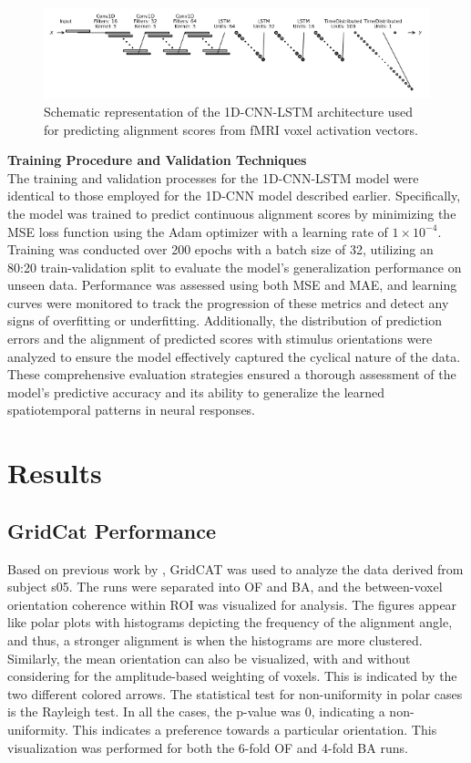 \documentclass[a4paper]{article}
\begin{document}
\begin{figure}
    \centering
    \includegraphics[width=1\linewidth]{hybrid2.png}
    \caption{Schematic representation of the 1D-CNN-LSTM architecture used for predicting alignment scores from
fMRI voxel activation vectors.}
    \label{fig:1D-CNN-LSTM}
\end{figure}

\noindent \textbf{Training Procedure and Validation Techniques}\\
The training and validation processes for the 1D-CNN-LSTM model were identical to those employed for the 1D-CNN model described earlier. Specifically, the model was trained to predict continuous alignment scores by minimizing the MSE loss function using the Adam optimizer with a learning rate of \(1 \times 10^{-4}\). Training was conducted over 200 epochs with a batch size of 32, utilizing an 80:20 train-validation split to evaluate the model's generalization performance on unseen data. Performance was assessed using both MSE and MAE, and learning curves were monitored to track the progression of these metrics and detect any signs of overfitting or underfitting. Additionally, the distribution of prediction errors and the alignment of predicted scores with stimulus orientations were analyzed to ensure the model effectively captured the cyclical nature of the data. These comprehensive evaluation strategies ensured a thorough assessment of the model's predictive accuracy and its ability to generalize the learned spatiotemporal patterns in neural responses.


\section{Results}

\subsection{\textbf{GridCat Performance}}
\label{sec:results}

Based on previous work by \cite{he_environmental_2019}, GridCAT was used to analyze the data derived from subject s05. The runs were separated into OF and BA, and the between-voxel orientation coherence within ROI was visualized for analysis. The figures appear like polar plots with histograms depicting the frequency of the alignment angle, and thus, a stronger alignment is when the histograms are more clustered. Similarly, the mean orientation can also be visualized, with and without considering for the amplitude-based weighting of voxels. This is indicated by the two different colored arrows. The statistical test for non-uniformity in polar cases is the Rayleigh test. In all the cases, the p-value was 0, indicating a non-uniformity. This indicates a preference towards a particular orientation. This visualization was performed for both the 6-fold OF and 4-fold BA runs.
\end{document}

